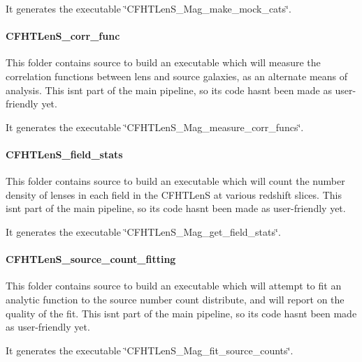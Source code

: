 It generates the executable \char`\"{}\+C\+F\+H\+T\+Len\+S\+\_\+\+Mag\+\_\+make\+\_\+mock\+\_\+cats\char`\"{}.

\paragraph*{C\+F\+H\+T\+Len\+S\+\_\+corr\+\_\+func}

This folder contains source to build an executable which will measure the correlation functions between lens and source galaxies, as an alternate means of analysis. This isn\textquotesingle{}t part of the main pipeline, so its code hasn\textquotesingle{}t been made as user-\/friendly yet.

It generates the executable \char`\"{}\+C\+F\+H\+T\+Len\+S\+\_\+\+Mag\+\_\+measure\+\_\+corr\+\_\+funcs\char`\"{}.

\paragraph*{C\+F\+H\+T\+Len\+S\+\_\+field\+\_\+stats}

This folder contains source to build an executable which will count the number density of lenses in each field in the C\+F\+H\+T\+Len\+S at various redshift slices. This isn\textquotesingle{}t part of the main pipeline, so its code hasn\textquotesingle{}t been made as user-\/friendly yet.

It generates the executable \char`\"{}\+C\+F\+H\+T\+Len\+S\+\_\+\+Mag\+\_\+get\+\_\+field\+\_\+stats\char`\"{}.

\paragraph*{C\+F\+H\+T\+Len\+S\+\_\+source\+\_\+count\+\_\+fitting}

This folder contains source to build an executable which will attempt to fit an analytic function to the source number count distribute, and will report on the quality of the fit. This isn\textquotesingle{}t part of the main pipeline, so its code hasn\textquotesingle{}t been made as user-\/friendly yet.

It generates the executable \char`\"{}\+C\+F\+H\+T\+Len\+S\+\_\+\+Mag\+\_\+fit\+\_\+source\+\_\+counts\char`\"{}. 